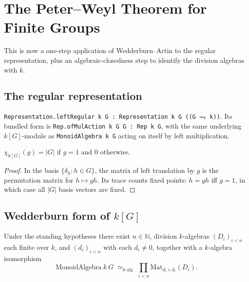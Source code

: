 \chapter{The Peter–Weyl Theorem for Finite Groups}
\label{chap:peter-weyl}

This is now a one-step application of Wedderburn–Artin to the regular
representation, plus an algebraic-closedness step to identify the division
algebras with $k$.

\section{The regular representation}

\begin{definition}
  \label{def:regular}
  \mathlibok
  \texttt{Representation.leftRegular k G : Representation k G ((G →₀ k))}.
  Its bundled form is \texttt{Rep.ofMulAction k G G : Rep k G}, with the same
  underlying $k[G]$-module as \texttt{MonoidAlgebra k G} acting on itself by
  left multiplication.
\end{definition}

\begin{lemma}
  \label{lem:char-regular}
  $\chi_{k[G]}(g) = |G|$ if $g = 1$ and $0$ otherwise.
\end{lemma}

\begin{proof}
  In the basis $\{\delta_h : h \in G\}$, the matrix of left translation by
  $g$ is the permutation matrix for $h \mapsto gh$. Its trace counts
  fixed points: $h = gh$ iff $g = 1$, in which case all $|G|$ basis vectors
  are fixed.
\end{proof}

\section{Wedderburn form of $k[G]$}

\begin{theorem}
  \label{thm:wedderburn-kG}
  \mathlibok
  \leanok
  Under the standing hypotheses there exist
  $n \in \mathbb N$, division $k$-algebras $(D_i)_{i < n}$ each finite
  over $k$, and $(d_i)_{i < n}$ with each $d_i \ne 0$, together with a
  $k$-algebra isomorphism
  \[
     \mathrm{MonoidAlgebra}\ k\ G \;\simeq_{k\text{-alg}}\;
     \prod_{i < n} \mathrm{Mat}_{d_i \times d_i}(D_i).
  \]
\end{theorem}

